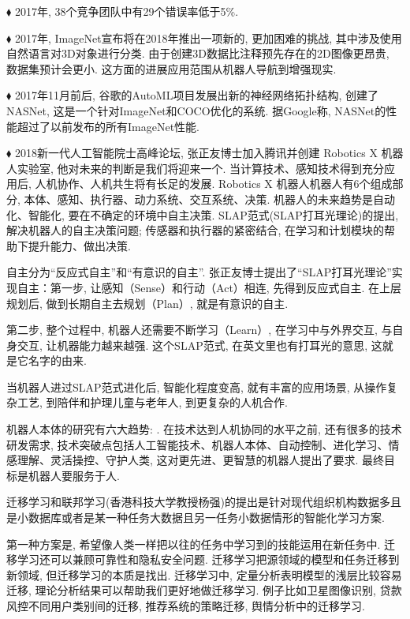 $\blacklozenge$ 2017年, 38个竞争团队中有29个错误率低于5\%.

$\blacklozenge$ 2017年, ImageNet宣布将在2018年推出一项新的, 更加困难的挑战, 其中涉及使用自然语言对3D对象进行分类. 由于创建3D数据比注释预先存在的2D图像更昂贵, 数据集预计会更小. 这方面的进展应用范围从机器人导航到增强现实.

$\blacklozenge$ 2017年11月前后, 谷歌的AutoML项目发展出新的神经网络拓扑结构, 创建了NASNet, 这是一个针对ImageNet和COCO优化的系统.
据Google称, NASNet的性能超过了以前发布的所有ImageNet性能.

$\blacklozenge$ 2018新一代人工智能院士高峰论坛, 张正友博士加入腾讯并创建 Robotics X 机器人实验室, 他对未来的判断是我们将迎来一个. 当计算技术、感知技术得到充分应用后, 人机协作、人机共生将有长足的发展.
Robotics X 机器人机器人有6个组成部分, 本体、感知、执行器、动力系统、交互系统、决策. 机器人的未来趋势是自动化、智能化, 要在不确定的环境中自主决策. SLAP范式(SLAP打耳光理论)的提出, 解决机器人的自主决策问题;
传感器和执行器的紧密结合, 在学习和计划模块的帮助下提升能力、做出决策.

自主分为“反应式自主”和“有意识的自主”.  张正友博士提出了“SLAP打耳光理论”实现自主：第一步, 让感知（Sense）和行动（Act）相连, 先得到反应式自主. 在上层规划后, 做到长期自主去规划（Plan）, 就是有意识的自主.

第二步, 整个过程中, 机器人还需要不断学习（Learn）, 在学习中与外界交互, 与自身交互, 让机器能力越来越强. 这个SLAP范式, 在英文里也有打耳光的意思, 这就是它名字的由来.

当机器人进过SLAP范式进化后, 智能化程度变高, 就有丰富的应用场景, 从操作复杂工艺, 到陪伴和护理儿童与老年人, 到更复杂的人机合作.


机器人本体的研究有六大趋势: . 在技术达到人机协同的水平之前, 还有很多的技术研发需求, 技术突破点包括人工智能技术、机器人本体、自动控制、进化学习、情感理解、灵活操控、守护人类, 这对更先进、更智慧的机器人提出了要求. 最终目标是机器人要服务于人.

迁移学习和联邦学习(香港科技大学教授杨强)的提出是针对现代组织机构数据多且是小数据库或者是某一种任务大数据且另一任务小数据情形的智能化学习方案.

第一种方案是, 希望像人类一样把以往的任务中学习到的技能运用在新任务中. 迁移学习还可以兼顾可靠性和隐私安全问题. 迁移学习把源领域的模型和任务迁移到新领域, 但迁移学习的本质是找出. 迁移学习中, 定量分析表明模型的浅层比较容易迁移, 理论分析结果可以帮助我们更好地做迁移学习. 例子比如卫星图像识别, 贷款风控不同用户类别间的迁移, 推荐系统的策略迁移, 舆情分析中的迁移学习.

